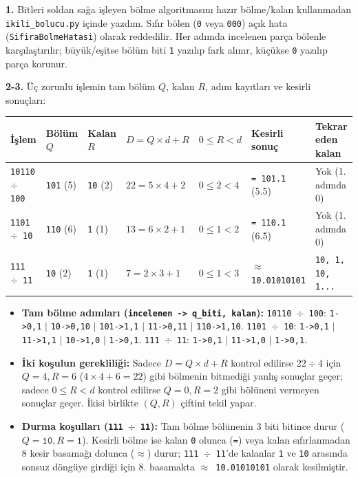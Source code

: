 \documentclass[10pt,a4paper]{article}
\begin{document}
\textbf{1.} Bitleri soldan sağa işleyen bölme algoritmasını hazır bölme/kalan kullanmadan \texttt{ikili\_bolucu.py} içinde yazdım. Sıfır bölen (\texttt{0} veya \texttt{000}) açık hata (\texttt{SifiraBolmeHatasi}) olarak reddedilir. Her adımda incelenen parça bölenle karşılaştırılır; büyük/eşitse bölüm biti \texttt{1} yazılıp fark alınır, küçükse \texttt{0} yazılıp parça korunur.

\textbf{2-3.} Üç zorunlu işlemin tam bölüm $Q$, kalan $R$, adım kayıtları ve kesirli sonuçları:

\begin{center}
\small
\begin{tabular}{lllllll}
\toprule
İşlem & Bölüm $Q$ & Kalan $R$ & $D = Q \times d + R$ & $0 \le R < d$ & Kesirli sonuç & Tekrar eden kalan \\
\midrule
\texttt{10110 $\div$ 100} & \texttt{101} (5) & \texttt{10} (2) & $22 = 5 \times 4 + 2$ & $0 \le 2 < 4$ & \texttt{= 101.1} (5.5) & Yok (1. adımda 0) \\
\texttt{1101 $\div$ 10} & \texttt{110} (6) & \texttt{1} (1) & $13 = 6 \times 2 + 1$ & $0 \le 1 < 2$ & \texttt{= 110.1} (6.5) & Yok (1. adımda 0) \\
\texttt{111 $\div$ 11} & \texttt{10} (2) & \texttt{1} (1) & $7 = 2 \times 3 + 1$ & $0 \le 1 < 3$ & \texttt{$\approx$ 10.01010101} & \texttt{10, 1, 10, 1...} \\
\bottomrule
\end{tabular}
\end{center}

\begin{itemize}
    \item \textbf{Tam bölme adımları (\texttt{incelenen -> q\_biti, kalan}):}
    \texttt{10110 $\div$ 100}: \texttt{1->0,1} $|$ \texttt{10->0,10} $|$ \texttt{101->1,1} $|$ \texttt{11->0,11} $|$ \texttt{110->1,10}. \;
    \texttt{1101 $\div$ 10}: \texttt{1->0,1} $|$ \texttt{11->1,1} $|$ \texttt{10->1,0} $|$ \texttt{1->0,1}. \;
    \texttt{111 $\div$ 11}: \texttt{1->0,1} $|$ \texttt{11->1,0} $|$ \texttt{1->0,1}.
    \item \textbf{İki koşulun gerekliliği:} Sadece $D = Q \times d + R$ kontrol edilirse $22 \div 4$ için $Q=4, R=6$ ($4 \times 4 + 6 = 22$) gibi bölmenin bitmediği yanlış sonuçlar geçer; sadece $0 \le R < d$ kontrol edilirse $Q=0, R=2$ gibi bölüneni vermeyen sonuçlar geçer. İkisi birlikte $(Q, R)$ çiftini tekil yapar.
    \item \textbf{Durma koşulları (\texttt{111 $\div$ 11}):} Tam bölme bölünenin 3 biti bitince durur ($Q=\texttt{10}, R=\texttt{1}$). Kesirli bölme ise kalan \texttt{0} olunca (\texttt{=}) veya kalan sıfırlanmadan 8 kesir basamağı dolunca (\texttt{$\approx$}) durur; \texttt{111 $\div$ 11}'de kalanlar \texttt{1} ve \texttt{10} arasında sonsuz döngüye girdiği için 8. basamakta \texttt{$\approx$ 10.01010101} olarak kesilmiştir.
\end{itemize}
\end{document}
